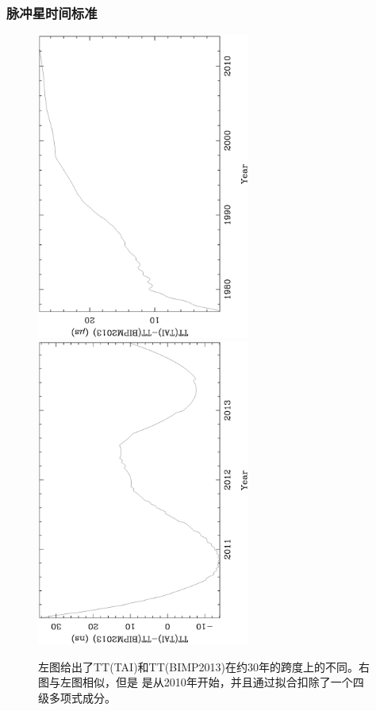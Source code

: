 \subsubsection{脉冲星时间标准}

\begin{figure}
\includegraphics[angle=-90,width=7cm]{timeDiff.ps}
\includegraphics[angle=-90,width=7cm]{timeDiff2010.ps}
\caption{左图给出了TT(TAI)和TT(BIMP2013)在约30年的跨度上的不同。右图与左图相似，但是
是从2010年开始，并且通过拟合扣除了一个四级多项式成分。} 
\label{fg:timeDiff}
\end{figure}

